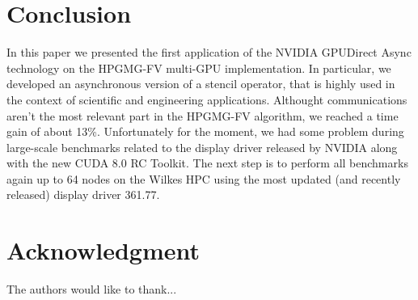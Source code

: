 \documentclass[conference]{IEEEtran}
\begin{document}


\section{Conclusion}

In this paper we presented the first application of the NVIDIA GPUDirect Async technology on the HPGMG-FV multi-GPU implementation.
In particular, we developed an asynchronous version of a stencil operator, that is highly used in the context of scientific and engineering applications.
Althought communications aren't the most relevant part in the HPGMG-FV algorithm, we reached a time gain of about 13\%.
Unfortunately for the moment, we had some problem during large-scale benchmarks related to the display driver released by NVIDIA along with the new CUDA 8.0 RC Toolkit.
The next step is to perform all benchmarks again up to 64 nodes on the Wilkes HPC using the most updated (and recently released) display driver 361.77.



\section*{Acknowledgment}

The authors would like to thank...



\end{document}
